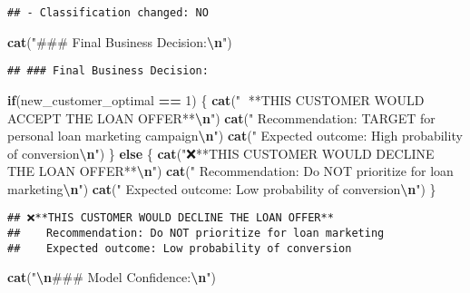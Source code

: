 \documentclass[
]{article}
\newenvironment{Shaded}{\begin{snugshade}}{\end{snugshade}}
\newcommand{\ControlFlowTok}[1]{\textcolor[rgb]{0.13,0.29,0.53}{\textbf{#1}}}
\newcommand{\DecValTok}[1]{\textcolor[rgb]{0.00,0.00,0.81}{#1}}
\newcommand{\FunctionTok}[1]{\textcolor[rgb]{0.13,0.29,0.53}{\textbf{#1}}}
\newcommand{\NormalTok}[1]{#1}
\newcommand{\SpecialCharTok}[1]{\textcolor[rgb]{0.81,0.36,0.00}{\textbf{#1}}}
\newcommand{\StringTok}[1]{\textcolor[rgb]{0.31,0.60,0.02}{#1}}
\begin{document}
\begin{verbatim}
## - Classification changed: NO
\end{verbatim}

\begin{Shaded}
\begin{Highlighting}[]
\FunctionTok{cat}\NormalTok{(}\StringTok{"\#\#\# Final Business Decision:}\SpecialCharTok{\textbackslash{}n}\StringTok{"}\NormalTok{)}
\end{Highlighting}
\end{Shaded}

\begin{verbatim}
## ### Final Business Decision:
\end{verbatim}

\begin{Shaded}
\begin{Highlighting}[]
\ControlFlowTok{if}\NormalTok{(new\_customer\_optimal }\SpecialCharTok{==} \DecValTok{1}\NormalTok{) \{}
  \FunctionTok{cat}\NormalTok{(}\StringTok{"🎯 **THIS CUSTOMER WOULD ACCEPT THE LOAN OFFER**}\SpecialCharTok{\textbackslash{}n}\StringTok{"}\NormalTok{)}
  \FunctionTok{cat}\NormalTok{(}\StringTok{"   Recommendation: TARGET for personal loan marketing campaign}\SpecialCharTok{\textbackslash{}n}\StringTok{"}\NormalTok{)}
  \FunctionTok{cat}\NormalTok{(}\StringTok{"   Expected outcome: High probability of conversion}\SpecialCharTok{\textbackslash{}n}\StringTok{"}\NormalTok{)}
\NormalTok{\} }\ControlFlowTok{else}\NormalTok{ \{}
  \FunctionTok{cat}\NormalTok{(}\StringTok{"❌**THIS CUSTOMER WOULD DECLINE THE LOAN OFFER**}\SpecialCharTok{\textbackslash{}n}\StringTok{"}\NormalTok{)}
  \FunctionTok{cat}\NormalTok{(}\StringTok{"   Recommendation: Do NOT prioritize for loan marketing}\SpecialCharTok{\textbackslash{}n}\StringTok{"}\NormalTok{)}
  \FunctionTok{cat}\NormalTok{(}\StringTok{"   Expected outcome: Low probability of conversion}\SpecialCharTok{\textbackslash{}n}\StringTok{"}\NormalTok{)}
\NormalTok{\}}
\end{Highlighting}
\end{Shaded}

\begin{verbatim}
## ❌**THIS CUSTOMER WOULD DECLINE THE LOAN OFFER**
##    Recommendation: Do NOT prioritize for loan marketing
##    Expected outcome: Low probability of conversion
\end{verbatim}

\begin{Shaded}
\begin{Highlighting}[]
\FunctionTok{cat}\NormalTok{(}\StringTok{"}\SpecialCharTok{\textbackslash{}n}\StringTok{\#\#\# Model Confidence:}\SpecialCharTok{\textbackslash{}n}\StringTok{"}\NormalTok{)}
\end{Highlighting}
\end{Shaded}
\end{document}

